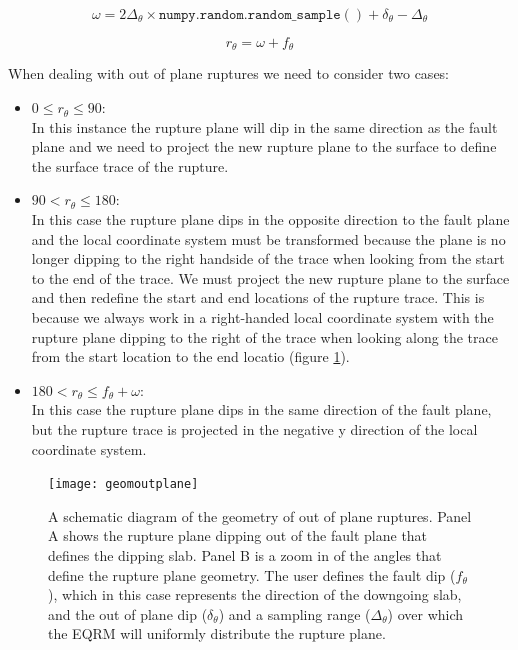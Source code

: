 \begin{equation}
\omega = 2\Delta_\theta  \times \mathtt{numpy.random.random\_sample()} + \delta_\theta - \Delta_\theta
\end{equation}

\begin{equation}
r_\theta = \omega + f_\theta
\end{equation}

When dealing with out of plane ruptures we need to consider two cases:
\begin{itemize} 
\item $0 \leq r_\theta \leq 90:$ \\ In this instance the rupture plane will dip in the same direction as the fault plane and we need to project the new rupture plane to the surface to define the surface trace of the rupture.
\item $90 <  r_\theta \leq 180:$ \\ In this case the rupture plane dips in the opposite direction to the fault plane and the local coordinate system must be transformed because the plane is no longer dipping to the right handside of the trace when looking from the start to the end of the trace. We must project the new rupture plane to the surface and then redefine the start and end locations of the rupture trace. This is because we always work in a right-handed local coordinate system with the rupture plane dipping to the right of the trace when looking along the trace from the start location to the end locatio (figure \ref{fig:intraslabGeom}).  
\item $180 < r_\theta \leq f_\theta + \omega :$ \\ In this case the rupture plane dips in the same direction of the fault plane, but the rupture trace is projected in the negative y direction of the local coordinate system. 
\end{itemize}
\begin{figure}[htp]
\centerline{\texttt{[image: geomoutplane]}}
\caption{A schematic diagram of the geometry of out of plane ruptures. Panel A shows the rupture plane dipping out of the fault plane that defines the dipping slab. Panel B is a zoom in of the angles that define the rupture plane geometry. The user defines the fault dip ($f_\theta$), which in this case represents the direction of the downgoing slab, and the out of plane dip ($\delta_\theta$) and a sampling range ($\Delta_\theta$) over which the EQRM will uniformly distribute the rupture plane. }
\label{fig:intraslabGeom}
\end{figure}




